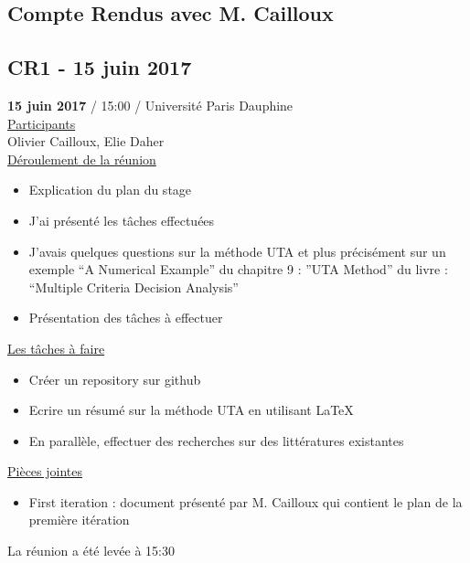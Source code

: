 \documentclass{report}
\begin{document}
\begin{appendices}

\chapter{Compte Rendus avec M. Cailloux}
\section{CR1 - 15 juin 2017}
\textbf{15 juin 2017} / 15:00 / Université Paris Dauphine \\

\underline{Participants} \\

Olivier Cailloux, Elie Daher\\

\underline{Déroulement de la réunion}\\
\begin{itemize}
	\item Explication du plan du stage
	\item J’ai présenté les tâches effectuées
	\item J’avais quelques questions sur la méthode UTA et plus précisément sur un exemple “A Numerical Example” du chapitre 9 : ”UTA Method” du livre : “Multiple Criteria Decision Analysis”
	\item Présentation des tâches à effectuer\\
\end{itemize}

\underline{Les tâches à faire} \\
\begin{itemize}
	\item Créer un repository sur github
	\item Ecrire un résumé sur la méthode UTA en utilisant LaTeX
	\item En parallèle, effectuer des recherches sur des littératures existantes\\
\end{itemize}

\underline{Pièces jointes} \\
\begin{itemize}
	\item First iteration : document présenté par M. Cailloux qui contient le plan de la première itération\\
\end{itemize}

La réunion a été levée à 15:30\\


\end{appendices}
\end{document}
